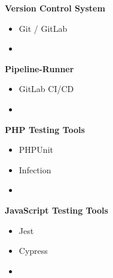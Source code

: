 \hspace{0.025\textwidth}%
\begin{minipage}{0.5\textwidth}
    \textbf{Version Control System}
    \vspace{-2mm}
    \begin{itemize}
        \setlength\itemsep{0em}
        \item Git / GitLab
        \item[]
    \end{itemize}
\end{minipage}%
\begin{minipage}{0.475\textwidth}
    \textbf{Pipeline-Runner}
    \vspace{-2mm}
    \begin{itemize}
        \setlength\itemsep{0em}
        \item GitLab CI/CD
        \item[]
    \end{itemize}
\end{minipage}

\hspace{0.025\textwidth}%
\begin{minipage}{0.5\textwidth}
    \textbf{PHP Testing Tools}
    \vspace{-2mm}
    \begin{itemize}
        \setlength\itemsep{0em}
        \item PHPUnit
        \item Infection
        \item[]
    \end{itemize}
\end{minipage}
\begin{minipage}{0.475\textwidth}
    \textbf{JavaScript Testing Tools}
    \vspace{-2mm}
    \begin{itemize}
        \setlength\itemsep{0em}
        \item Jest
        \item Cypress
        \item[]
    \end{itemize}
\end{minipage}

